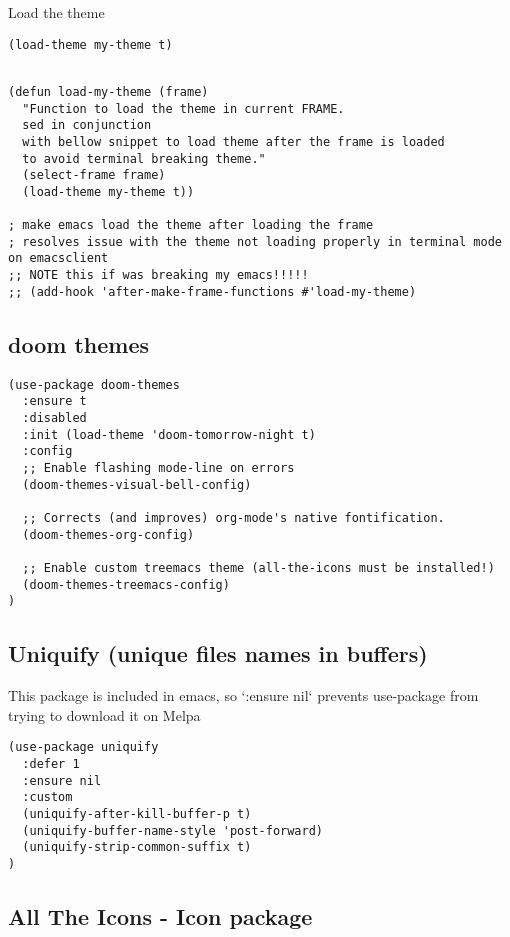 \documentclass[11pt]{article}
\begin{document}
Load the theme

\begin{verbatim}
(load-theme my-theme t)
\end{verbatim}


\begin{verbatim}

(defun load-my-theme (frame)
  "Function to load the theme in current FRAME.
  sed in conjunction
  with bellow snippet to load theme after the frame is loaded
  to avoid terminal breaking theme."
  (select-frame frame)
  (load-theme my-theme t))

; make emacs load the theme after loading the frame
; resolves issue with the theme not loading properly in terminal mode on emacsclient
;; NOTE this if was breaking my emacs!!!!!
;; (add-hook 'after-make-frame-functions #'load-my-theme)
\end{verbatim}


\subsection*{doom themes}
\label{sec:org507e85b}
\begin{verbatim}
(use-package doom-themes
  :ensure t
  :disabled
  :init (load-theme 'doom-tomorrow-night t)
  :config
  ;; Enable flashing mode-line on errors
  (doom-themes-visual-bell-config)

  ;; Corrects (and improves) org-mode's native fontification.
  (doom-themes-org-config)

  ;; Enable custom treemacs theme (all-the-icons must be installed!)
  (doom-themes-treemacs-config)
)
\end{verbatim}

\subsection*{Uniquify (unique files names in buffers)}
\label{sec:orga4ace43}

This package is included in emacs, so `:ensure nil` prevents use-package from trying to download it on Melpa

\begin{verbatim}
(use-package uniquify
  :defer 1
  :ensure nil
  :custom
  (uniquify-after-kill-buffer-p t)
  (uniquify-buffer-name-style 'post-forward)
  (uniquify-strip-common-suffix t)
)
\end{verbatim}

\subsection*{All The Icons - Icon package}
\label{sec:org28af1a0}
\end{document}
